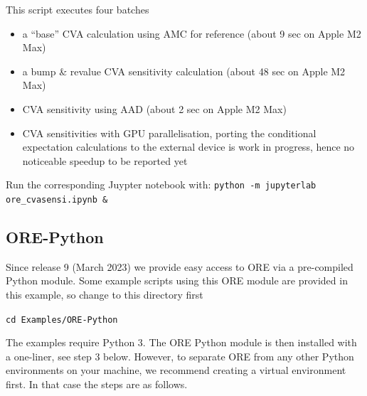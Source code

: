 This script executes four batches
\begin{itemize}
\item a ``base'' CVA calculation using AMC for reference (about 9 sec on Apple M2 Max)
\item a bump \& revalue CVA sensitivity calculation (about 48 sec on Apple M2 Max)
\item CVA sensitivity using AAD (about 2 sec on Apple M2 Max) 
\item CVA sensitivities with GPU parallelisation, porting the conditional expectation calculations
  to the external device is work in progress, hence no noticeable speedup to be reported yet
\end{itemize}

Run the corresponding Juypter notebook with: {\tt python -m jupyterlab ore\_cvasensi.ipynb \&} 

\subsection{ORE-Python}\label{example:orepython}

Since release 9 (March 2023) we provide easy access to ORE via a pre-compiled Python module. Some example scripts using
this ORE module are provided in this example, so change to this directory first

\medskip
{\tt cd Examples/ORE-Python} 

\medskip
The examples require Python 3. The ORE Python module is then installed with a one-liner, see step 3 below. However, to
separate ORE from any other Python environments on your machine, we recommend creating a virtual environment first.
In that case the steps are as follows. 

